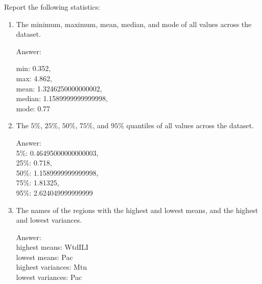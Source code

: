 \documentclass{article}
\newcommand{\blu}[1]{{\textcolor{blu}{#1}}}
\newenvironment{answer}{\par\begingroup\color{gre}Answer: }{\endgroup}
\let\ask\blu
\begin{document}
  \ask{Report the following statistics}:
  \begin{enumerate}
  \item The minimum, maximum, mean, median, and mode of all values across the dataset.
  \begin{answer}

     min: 0.352,\\
     max: 4.862, \\ 
     mean: 1.3246250000000002, \\
     median: 1.1589999999999998,\\
     mode: 0.77 
  \end{answer}
  \item The $5\%$, $25\%$, $50\%$, $75\%$, and $95\%$ quantiles of all values across the dataset.
  \begin{answer} \\
     5\%: 0.46495000000000003,\\ 
     25\%: 0.718, \\
     50\%: 1.1589999999999998, \\ 
     75\%: 1.81325, \\
     95\%: 2.624049999999999
  \end{answer}
  \item The names of the regions with the highest and lowest means, and the highest and lowest variances.%
  \begin{answer}\\
       highest means: WtdILI\\
       lowest means: Pac\\
       highest variances: Mtn\\
       lowest variances: Pac
  \end{answer}
  \end{enumerate}
\end{document}
